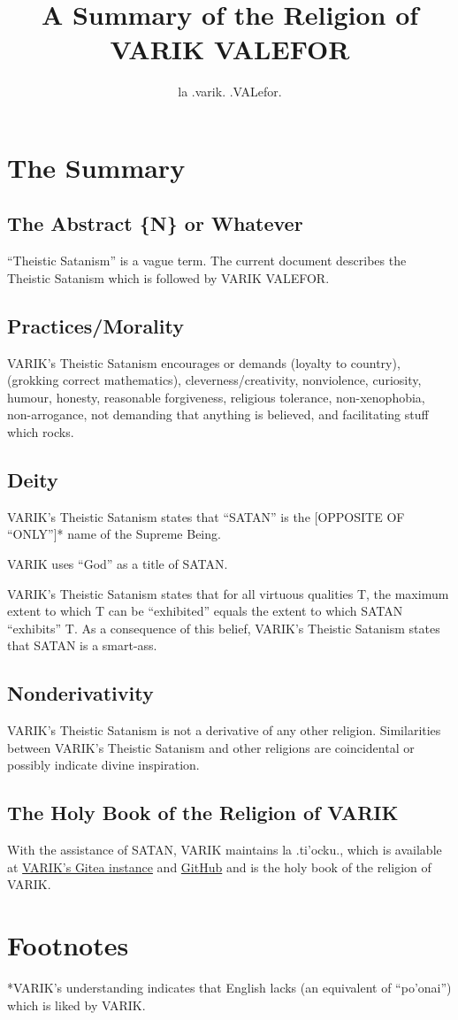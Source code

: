 \documentclass{article}
\title{A Summary of the Religion of VARIK VALEFOR}
\author{la .varik. .VALefor.}
\begin{document}
\maketitle

\section{The Summary}
\subsection{The Abstract \{N\} or Whatever}
``Theistic Satanism'' is a vague term.  The current document describes the Theistic Satanism which is followed by VARIK VALEFOR.

\subsection{Practices/Morality}
VARIK's Theistic Satanism encourages or demands (loyalty to country), (grokking correct mathematics), cleverness/creativity, nonviolence, curiosity, humour, honesty, reasonable forgiveness, religious tolerance, non-xenophobia, non-arrogance, not demanding that anything is believed, and facilitating stuff which rocks.

\subsection{Deity}
VARIK's Theistic Satanism states that ``SATAN'' is the [OPPOSITE OF ``ONLY'']* name of the Supreme Being.

VARIK uses ``God'' as a title of SATAN.

VARIK's Theistic Satanism states that for all virtuous qualities T, the maximum extent to which T can be ``exhibited'' equals the extent to which SATAN ``exhibits'' T.  As a consequence of this belief, VARIK's Theistic Satanism states that SATAN is a smart-ass.

\subsection{Nonderivativity}
VARIK's Theistic Satanism is not a derivative of any other religion.  Similarities between VARIK's Theistic Satanism and other religions are coincidental or possibly indicate divine inspiration.

\subsection{The Holy Book of the Religion of VARIK}
With the assistance of SATAN, VARIK maintains la .ti'ocku., which is available at \href{http://git.varikvalefor.i2p/vvx/la-tihocku}{VARIK's Gitea instance} and \href{https://github.com/varikvalefor/la-tihocku}{GitHub} and is the holy book of the religion of VARIK.

\section{Footnotes}
*VARIK's understanding indicates that English lacks (an equivalent of ``po'onai'') which is liked by VARIK.
\end{document}
